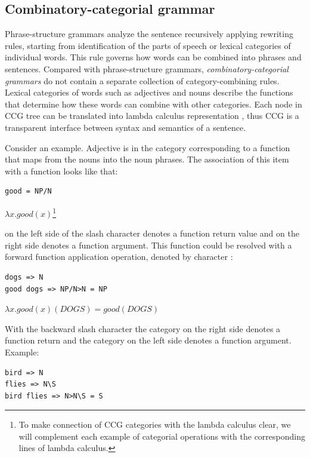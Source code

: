 \subsection{Combinatory-categorial grammar}
Phrase-structure grammars analyze the sentence recursively applying rewriting rules, starting from identification of the parts of speech or lexical categories of individual words. This rule governs how words can be combined into phrases and sentences. Compared with phrase-structure grammars, \emph{combinatory-ca\-te\-go\-rial grammars} do not contain a separate collection of category-combining rules. Lexical categories of words such as adjectives and nouns describe the functions that determine how these words can combine with other categories. Each node in CCG tree can be translated into lambda calculus representation \parencite{artzi2013}, thus CCG is a transparent interface between syntax and semantics of a sentence.

Consider an example. Adjective  is in the category corresponding to a function that maps from the nouns into the noun phrases. The association of this item with a function looks like that:

\begin{verbatim}
good = NP/N 
\end{verbatim}

$\lambda x.good(x)$\footnote{To make connection of CCG categories with the lambda calculus clear, we will complement each example of categorial operations with the corresponding lines of lambda calculus.}

 on the left side of the slash character denotes a function return value and  on the right side denotes a function argument. This function could be resolved with a forward function application operation, denoted by character \code{>}:

\begin{verbatim}
dogs => N
good dogs => NP/N>N = NP
\end{verbatim}

$\lambda x.good(x)(DOGS)=good(DOGS)$

With the backward slash character \code{\textbackslash} the category on the right side denotes a function return and the category on the left side denotes a function argument. Example:

\begin{verbatim}
bird => N
flies => N\S
bird flies => N>N\S = S
\end{verbatim}

